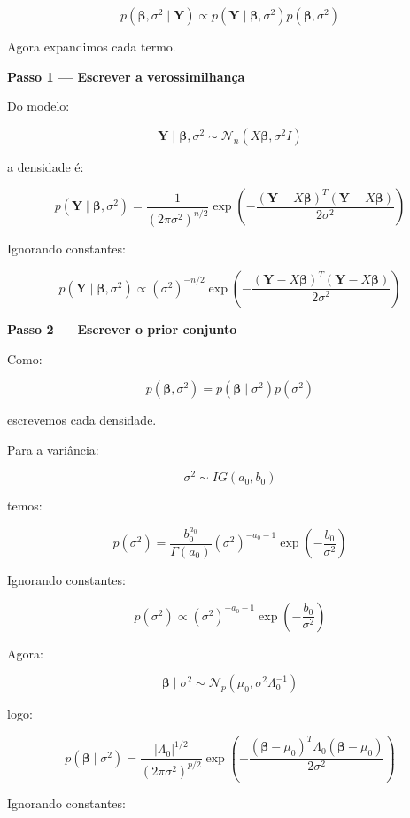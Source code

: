 \documentclass[12pt, a4paper]{article}
\begin{document}
\[
p(\boldsymbol{\beta},\sigma^2\mid\mathbf Y)
\propto
p(\mathbf Y\mid\boldsymbol{\beta},\sigma^2)
p(\boldsymbol{\beta},\sigma^2)
\]

Agora expandimos cada termo.

\vspace{0.3cm}

\textbf{Passo 1 — Escrever a verossimilhança}

Do modelo:

\[
\mathbf Y\mid\boldsymbol\beta,\sigma^2
\sim
\mathcal N_n
(X\boldsymbol\beta,\sigma^2I)
\]

a densidade é:

\[
p(\mathbf Y\mid\boldsymbol\beta,\sigma^2)
=
\frac1{(2\pi\sigma^2)^{n/2}}
\exp
\left(
-
\frac{
(\mathbf Y-X\boldsymbol\beta)^T
(\mathbf Y-X\boldsymbol\beta)
}{
2\sigma^2
}
\right)
\]

Ignorando constantes:

\[
p(\mathbf Y\mid\boldsymbol\beta,\sigma^2)
\propto
(\sigma^2)^{-n/2}
\exp
\left(
-
\frac{
(\mathbf Y-X\boldsymbol\beta)^T
(\mathbf Y-X\boldsymbol\beta)
}{
2\sigma^2
}
\right)
\]

\vspace{0.3cm}

\textbf{Passo 2 — Escrever o prior conjunto}

Como:

\[
p(\boldsymbol\beta,\sigma^2)
=
p(\boldsymbol\beta\mid\sigma^2)
p(\sigma^2)
\]

escrevemos cada densidade.

Para a variância:

\[
\sigma^2\sim IG(a_0,b_0)
\]

temos:

\[
p(\sigma^2)
=
\frac{b_0^{a_0}}
{\Gamma(a_0)}
(\sigma^2)^{-a_0-1}
\exp
\left(
-\frac{b_0}{\sigma^2}
\right)
\]

Ignorando constantes:

\[
p(\sigma^2)
\propto
(\sigma^2)^{-a_0-1}
\exp
\left(
-\frac{b_0}{\sigma^2}
\right)
\]

Agora:

\[
\boldsymbol\beta\mid\sigma^2
\sim
\mathcal N_p
(
\mu_0,
\sigma^2\Lambda_0^{-1}
)
\]

logo:

\[
p(\boldsymbol\beta\mid\sigma^2)
=
\frac{
|\Lambda_0|^{1/2}
}{
(2\pi\sigma^2)^{p/2}
}
\exp
\left(
-
\frac{
(\boldsymbol\beta-\mu_0)^T
\Lambda_0
(\boldsymbol\beta-\mu_0)
}{
2\sigma^2
}
\right)
\]

Ignorando constantes:
\end{document}
